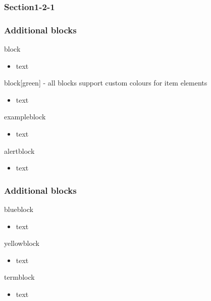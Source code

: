 \documentclass[t,compress,aspectratio=169]{beamer}
\begin{document}
\subsubsection{Section1-2-1}
\begin{frame}
\frametitle{Additional blocks}
\begin{block}{block}
\begin{itemize} \item text \end{itemize}
\end{block}
\begin{block}[green]{block[green] - all blocks support custom colours for item elements}
\begin{itemize} \item text \end{itemize}
\end{block}
\begin{exampleblock}{exampleblock}
\begin{itemize} \item text \end{itemize}
\end{exampleblock}
\begin{alertblock}{alertblock}
\begin{itemize} \item text \end{itemize}
\end{alertblock}
\end{frame}

\begin{frame}
\frametitle{Additional blocks}
\begin{blueblock}{blueblock}
\begin{itemize} \item text \end{itemize}
\end{blueblock}
\begin{yellowblock}{yellowblock}
\begin{itemize} \item text \end{itemize}
\end{yellowblock}
\begin{termblock}{termblock}
\begin{itemize} \item text \end{itemize}
\end{termblock}
\end{frame}
\end{document}
